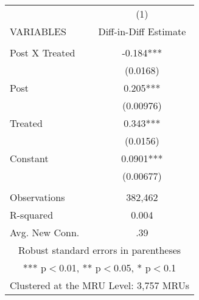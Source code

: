 \begin{tabular}{lc} \hline
 & (1) \\
VARIABLES & Diff-in-Diff Estimate \\ \hline
 &  \\
Post X Treated & -0.184*** \\
 & (0.0168) \\
Post & 0.205*** \\
 & (0.00976) \\
Treated & 0.343*** \\
 & (0.0156) \\
Constant & 0.0901*** \\
 & (0.00677) \\
 &  \\
Observations & 382,462 \\
R-squared & 0.004 \\
 Avg. New Conn. & .39 \\ \hline
\multicolumn{2}{c}{ Robust standard errors in parentheses} \\
\multicolumn{2}{c}{ *** p$<$0.01, ** p$<$0.05, * p$<$0.1} \\
\multicolumn{2}{c}{ Clustered at the MRU Level: 3,757 MRUs} \\
\end{tabular}
